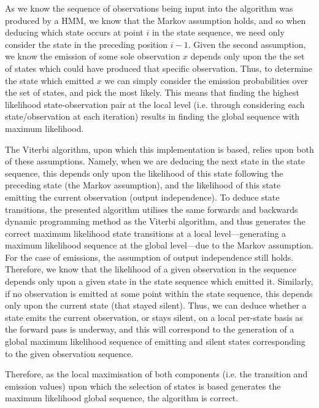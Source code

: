 \documentclass[a4paper, 11pt]{article}
\begin{document}
	As we know the sequence of observations being input into the algorithm was produced by a HMM, we know that the Markov assumption holds, and so when deducing which state occurs at point $i$ in the state sequence, we need only consider the state in the preceding position $i-1$. Given the second assumption, we know the emission of some sole observation $x$ depends only upon the the set of states which could have produced that specific observation. Thus, to determine the state which emitted $x$ we can simply consider the emission probabilities over the set of states, and pick the most likely. This means that finding the highest likelihood state-observation pair at the local level (i.e. through considering each state/observation at each iteration) results in finding the global sequence with maximum likelihood. 
	
	The Viterbi algorithm, upon which this implementation is based, relies upon both of these assumptions. Namely, when we are deducing the next state in the state sequence, this depends only upon the likelihood of this state following the preceding state (the Markov assumption), and the likelihood of this state emitting the current observation (output independence). To deduce state transitions, the presented algorithm utilises the same forwards and backwards dynamic programming method as the Viterbi algorithm, and thus generates the correct maximum likelihood state transitions at a local level---generating a maximum likelihood sequence at the global level---due to the Markov assumption. For the case of emissions, the assumption of output independence still holds. Therefore, we know that the likelihood of a given observation in the sequence depends only upon a given state in the state sequence which emitted it. Similarly, if no observation is emitted at some point within the state sequence, this depends only upon the current state (that stayed silent). Thus, we can deduce whether a state emits the current observation, or stays silent, on a local per-state basis as the forward pass is underway, and this will correspond to the generation of a global maximum likelihood sequence of emitting and silent states corresponding to the given observation sequence.
	
	Therefore, as the local maximisation of both components (i.e. the transition and emission values) upon which the selection of states is based generates the maximum likelihood global sequence, the algorithm is correct.
	
\end{document}
